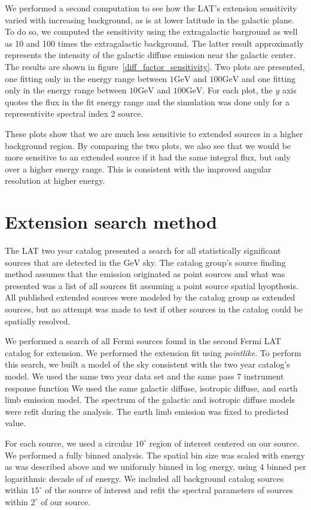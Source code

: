 \documentclass[preprint]{aastex}
\newcommand{\gev}{\text{GeV}}
\newcommand{\pointlike}{{\em pointlike}}
\begin{document}
We performed a second computation to see how the LAT's extension
sensitivity varied with increasing background, as is at lower latitude
in the galactic plane. To do so, we computed the sensitivity using the
extragalactic barground as well as 10 and 100 times the extragalactic
background. The latter result approximatly represents the intensity of
the galactic diffuse emission near the galactic center. The results are
shown in figure~\ref{diff_factor_sensitivity}. Two plots are presented,
one fitting only in the energy range between $1\gev$ and $100\gev$ and
one fitting only in the energy range between $10\gev$ and $100\gev$. For
each plot, the $y$ axis quotes the flux in the fit energy range and the
simulation was done only for a representivite spectral index 2 source.

These plots show that we are much less sensitivie to extended sources in
a higher background region. By comparing the two plots, we also see that
we would be more sensitive to an extended source if it had the same
integral flux, but only over a higher energy range. This is 
consistent with the improved angular resolution at higher energy.

\section{Extension search method}

The LAT two year catalog presented a search for all
statistically significant sources that are detected in the $\gev$
sky\cite{2FGL_catalog}.  The catalog group's source finding method assumes
that the emission originated as point sources and what was presented was
a list of all sources fit assuming a point source spatial hyopthesis. All
published extended sources were modeled by the catalog group as extended
sources, but no attempt was made to test if other sources in the catalog
could be spatially resolved.

We performed a search of all Fermi sources found in the second Fermi LAT
catalog for extension.  We performed the extension fit using \pointlike.
To perform this search, we built a model of the sky consistent with
the two year catalog's model.   We used the same two year data set and
the same pass 7 instrument response function We used the same galactic
diffuse, isotropic diffuse, and earth limb emission model. The spectrum
of the galactic and isotropic diffuse models were refit during the
analysis. The earth limb emission was fixed to predicted value.

For each source, we used a circular $10^\circ$ region of interest centered
on our source. We performed a fully binned analysis.  The spatial bin
size was scaled with energy as was described above and we uniformly
binned in log energy, using 4 binned per logarithmic decade of of energy.
We included all background catalog sources within $15^\circ$ of the source
of interest and refit the spectral parameters of sources within $2^\circ$
of our source.
\end{document}
